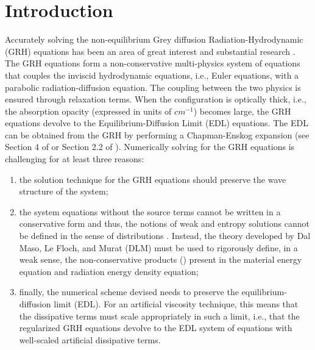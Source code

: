 \documentclass[times,doublespace]{fldauth}%
\begin{document}

\maketitle

%
\section{Introduction}
\label{sec:intro}
Accurately solving the non-equilibrium Grey diffusion Radiation-Hydrodynamic (GRH) equations has been an area of great interest and substantial research \cite{Balsara,LowrieMorelHittinger,LowrieEdwards,EdwardsMorelLowrie}.
The GRH equations form a non-conservative multi-physics system of equations that couples the inviscid hydrodynamic equations, i.e., Euler equations, with a parabolic radiation-diffusion equation. 
The coupling between the two physics is ensured through relaxation terms. When the configuration is optically thick, i.e., the absorption opacity (expressed in units of $cm^{-1}$) becomes large, the GRH equations devolve to the Equilibrium-Diffusion Limit (EDL) equations. 
The EDL can be obtained from the GRH by performing a Chapman-Enskog expansion (see Section 4 of \cite{LowrieMorel} or Section 2.2 of \cite{our_jcp_radhy_paper}).
Numerically solving for the GRH equations is challenging for at least three reasons: 
\begin{enumerate}
\item
the solution technique for the GRH equations should preserve the wave structure of the system; 
\item
the system equations without the source terms cannot be written in a conservative form and thus, the notions of weak and entropy solutions cannot be defined in the sense of distributions \cite{dlm, lefloch_1988, lefloch_1989, lefloch_liu_1993, bianchini_bressan_2005}.  Instead, the theory developed by Dal Maso, Le Floch, and Murat (DLM) must be used to rigorously define, in a weak sense, the non-conservative products (\cite{dlm}) present in the material energy equation and radiation energy density equation;
\item
finally, the numerical scheme devised needs to preserve the equilibrium-diffusion limit (EDL). For an artificial viscosity technique, this means that the dissipative terms must scale appropriately in such a limit, i.e., that the regularized GRH equations 
devolve to the EDL system of equations with well-scaled artificial dissipative terms.
\end{enumerate}
\end{document}
